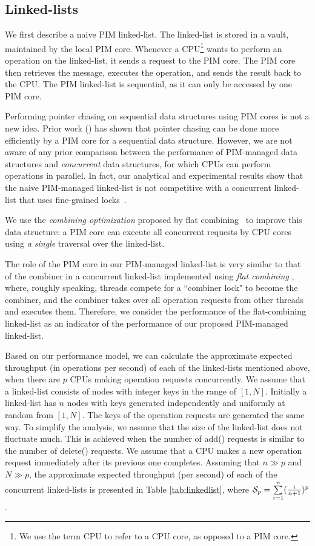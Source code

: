 \subsection{Linked-lists}
\label{section:linked_list}
We first describe a naive PIM linked-list.  The linked-list is stored
in a vault, maintained by the local PIM core.  Whenever a
CPU\footnote{We use the term CPU to refer to a CPU core, as opposed to
  a PIM core.}  wants to perform an operation on the linked-list, it
sends a request to the PIM core.  The PIM core then retrieves the
message, executes the operation, and sends the result back to the CPU.
The PIM linked-list is sequential, as it can only be accessed by one
PIM core.

Performing pointer chasing on sequential data structures using PIM
cores is not a new idea.  Prior work (\cite{hsieh2016accelerating,
  Ahn2015:2, Hashemi:2016}) has shown that pointer chasing can be done
more efficiently by a PIM core for a sequential data structure.
However, we are not aware of any prior comparison between the
performance of PIM-managed data structures and \emph{concurrent} data
structures, for which CPUs can perform operations in parallel.  In fact,
our analytical and experimental results show that the naive
PIM-managed linked-list is not competitive with a concurrent
linked-list that uses fine-grained locks~\cite{Heller05}.

We use the \textit{combining optimization} proposed by flat
combining~\cite{Hendler10} to improve this data structure: a PIM core
can execute all concurrent requests by CPU cores using \emph{a single}
traversal over the linked-list.

The role of the PIM core in our PIM-managed linked-list is very
similar to that of the combiner in a concurrent linked-list
implemented using \textit{flat combining} \cite{Hendler10}, where,
roughly speaking, threads compete for a ``combiner lock" to become the
combiner, and the combiner takes over all operation requests from
other threads and executes them.  Therefore, we consider the
performance of the flat-combining linked-list as an indicator of the
performance of our proposed PIM-managed linked-list.

Based on our performance model, we can calculate the approximate
expected throughput (in operations per second) of each of the
linked-lists mentioned above, when there are $p$ CPUs making operation
requests concurrently.  We assume that a linked-list consists of nodes
with integer keys in the range of $[1, N]$.  Initially a linked-list
has $n$ nodes with keys generated independently and uniformly at
random from $[1, N]$.  The keys of the operation requests are
generated the same way.  To simplify the analysis, we assume that the
size of the linked-list does not fluctuate much.  This is achieved
when the number of add() requests is similar to the number of delete()
requests.  We assume that a CPU makes a new operation request
immediately after its previous one completes.  Assuming that $n \gg p$
and $N \gg p$, the approximate expected throughput (per second) of
each of the concurrent linked-lists is presented in Table
\ref{tab:linkedlist}, where $\mathcal{S}_{p} = \sum\limits_{i=1}^{n} ({i \over
  n+1})^{p}$.


